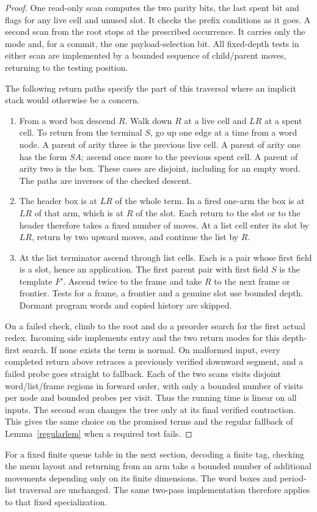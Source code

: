 \documentclass[11pt,letterpaper,oneside,reqno]{amsart}
\begin{document}
\begin{proof}
One read-only scan computes the two parity bits, the last spent bit and flags for any live cell and unused slot. It checks the prefix conditions as it goes. A second scan from the root stops at the prescribed occurrence. It carries only the mode and, for a commit, the one payload-selection bit. All fixed-depth tests in either scan are implemented by a bounded sequence of child/parent moves, returning to the testing position.

The following return paths specify the part of this traversal where an implicit stack would otherwise be a concern.
\begin{enumerate}
\item From a word box descend \(R\). Walk down \(R\) at a live cell and \(LR\) at a spent cell. To return from the terminal \(S\), go up one edge at a time from a word node. A parent of arity three is the previous live cell. A parent of arity one has the form \(SA\); ascend once more to the previous spent cell. A parent of arity two is the box. These cases are disjoint, including for an empty word. The paths are inverses of the checked descent.
\item The header box is at \(LR\) of the whole term. In a fired one-arm the box is at \(LR\) of that arm, which is at \(R\) of the slot. Each return to the slot or to the header therefore takes a fixed number of moves. At a list cell enter its slot by \(LR\), return by two upward moves, and continue the list by \(R\).
\item At the list terminator ascend through list cells. Each is a pair whose first field is a slot, hence an application. The first parent pair with first field \(S\) is the template \(F'\). Ascend twice to the frame and take \(R\) to the next frame or frontier. Tests for a frame, a frontier and a genuine slot use bounded depth. Dormant program words and copied history are skipped.
\end{enumerate}
On a failed check, climb to the root and do a preorder search for the first actual redex. Incoming side implements entry and the two return modes for this depth-first search. If none exists the term is normal. On malformed input, every completed return above retraces a previously verified downward segment, and a failed probe goes straight to fallback. Each of the two scans visits disjoint word/list/frame regions in forward order, with only a bounded number of visits per node and bounded probes per visit. Thus the running time is linear on all inputs. The second scan changes the tree only at its final verified contraction. This gives the same choice on the promised terms and the regular fallback of Lemma~\ref{regularlem} when a required test fails.
\end{proof}
For a fixed finite queue table in the next section, decoding a finite tag, checking the menu layout and returning from an arm take a bounded number of additional movements depending only on its finite dimensions. The word boxes and period-list traversal are unchanged. The same two-pass implementation therefore applies to that fixed specialization.
\end{document}
